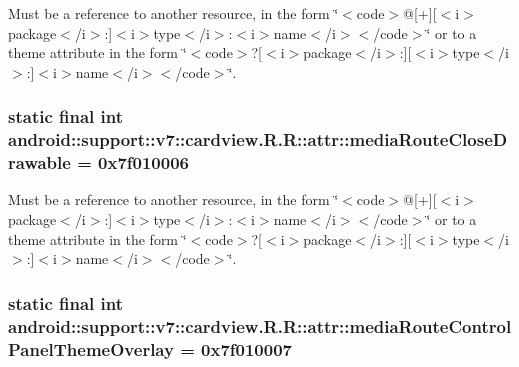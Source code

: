 Must be a reference to another resource, in the form \char`\"{}$<$code$>$@\mbox{[}+\mbox{]}\mbox{[}$<$i$>$package$<$/i$>$:\mbox{]}$<$i$>$type$<$/i$>$:$<$i$>$name$<$/i$>$$<$/code$>$\char`\"{} or to a theme attribute in the form \char`\"{}$<$code$>$?\mbox{[}$<$i$>$package$<$/i$>$:\mbox{]}\mbox{[}$<$i$>$type$<$/i$>$:\mbox{]}$<$i$>$name$<$/i$>$$<$/code$>$\char`\"{}. \hypertarget{classandroid_1_1support_1_1v7_1_1cardview_1_1_r_1_1attr_b1aa6a0029edba60a2fe5c8eab03ac7c}{
\subsubsection[{mediaRouteCloseDrawable}]{\setlength{\rightskip}{0pt plus 5cm}static final int android::support::v7::cardview.R.R::attr::mediaRouteCloseDrawable = 0x7f010006}}
\label{classandroid_1_1support_1_1v7_1_1cardview_1_1_r_1_1attr_b1aa6a0029edba60a2fe5c8eab03ac7c}


Must be a reference to another resource, in the form \char`\"{}$<$code$>$@\mbox{[}+\mbox{]}\mbox{[}$<$i$>$package$<$/i$>$:\mbox{]}$<$i$>$type$<$/i$>$:$<$i$>$name$<$/i$>$$<$/code$>$\char`\"{} or to a theme attribute in the form \char`\"{}$<$code$>$?\mbox{[}$<$i$>$package$<$/i$>$:\mbox{]}\mbox{[}$<$i$>$type$<$/i$>$:\mbox{]}$<$i$>$name$<$/i$>$$<$/code$>$\char`\"{}. \hypertarget{classandroid_1_1support_1_1v7_1_1cardview_1_1_r_1_1attr_35baf4d7dbb4b3f19c254ce70037d98a}{
\subsubsection[{mediaRouteControlPanelThemeOverlay}]{\setlength{\rightskip}{0pt plus 5cm}static final int android::support::v7::cardview.R.R::attr::mediaRouteControlPanelThemeOverlay = 0x7f010007}}
\label{classandroid_1_1support_1_1v7_1_1cardview_1_1_r_1_1attr_35baf4d7dbb4b3f19c254ce70037d98a}


